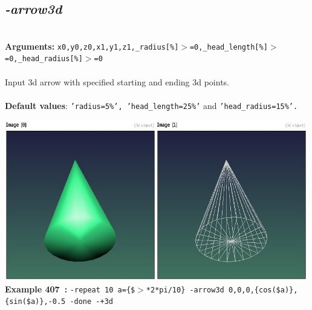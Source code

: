 \documentclass[a4paper,11pt,twoside]{book}
\begin{document}
\subsection{\emph{-arrow3d} }\vspace*{-0.5em}
~\\\textbf{Arguments: } 
{\small \texttt{x0,y0,z0,x1,y1,z1,\_radius[\%]$>$=0,\_head\_length[\%]$>$=0,\_head\_radius[\%]$>$=0}}\\~\\
Input 3d arrow with specified starting and ending 3d points.
~\\~\\\textbf{Default values}: {\small \texttt{'radius=5\%', 'head\_length=25\%'} and \texttt{'head\_radius=15\%'.}}
\begin{center}\includegraphics[keepaspectratio=true,height=7cm,width=\textwidth]{img/gmic_def407.jpg}\\
{\footnotesize \textbf{Example 407~:} \texttt{-repeat 10 a=\{\$$>$*2*pi/10\} -arrow3d 0,0,0,\{cos(\$a)\},\{sin(\$a)\},-0.5 -done -+3d}}
\end{center}
\end{document}
